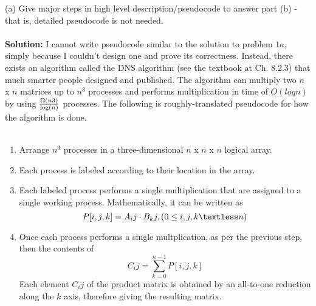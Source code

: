 \documentclass{article}
\begin{document}
\noindent(a) Give major steps in high level description/pseudocode to answer part (b) - that is,
detailed pseudocode is not needed.\\~\\
\textbf{Solution:} I cannot write pseudocode similar to the solution to problem $1a$, simply because I 
couldn't design one and prove its correctness. Instead, there exists an algorithm called the 
DNS algorithm (see the textbook at Ch. 8.2.3) that much smarter people designed and published. The algorithm 
can multiply two $n$ x $n$ matrices up to $n^{3}$ processes and performs multiplication in time of 
$O(log n)$ by using $\Omega(n3) \over \log (n)$ processes. The following is roughly-translated pseudocode for how 
the algorithm is done.\\~\\
\begin{enumerate}
    \item Arrange $n^{3}$ processes in a three-dimensional $n$ x $n$ x $n$ logical array.
    \item Each process is labeled according to their location in the array.
    \item Each labeled process performs a single multiplication that are assigned to a single working process.
        Mathematically, it can be written as 
        \begin{equation}
            P[i,j,k] = A_{i}{j} \cdot B_{k}{j}, (0 \leq i,j,k \textless n)
        \end{equation}
    \item Once each process performs a single multplication, as per the previous step, then the contents of 
        \[ C_{i}{j} = \sum_{k=0}^{n-1} P[i,j,k] \]
        Each element $C_{i}{j}$ of the product matrix is obtained by an all-to-one reduction along the $k$ axis,
        therefore giving the resulting matrix.
\end{enumerate}
\end{document}
